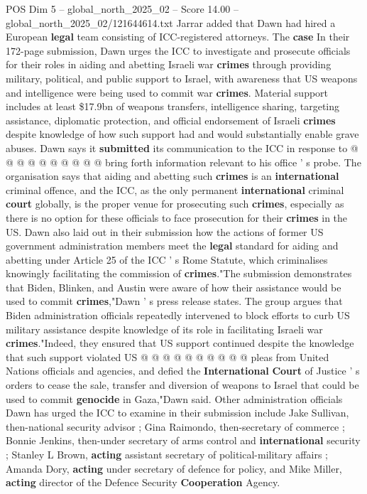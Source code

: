 \begin{textsample}{POS Dim 5 – global\_north\_2025\_02 – Score 14.00 – global\_north\_2025\_02/121644614.txt}
Jarrar added that Dawn had hired a European \textbf{legal} team consisting of ICC-registered attorneys.
The \textbf{case} In their 172-page submission, Dawn urges the ICC to investigate and prosecute officials for their roles in aiding and abetting Israeli war \textbf{crimes} through providing military, political, and public support to Israel, with awareness that US weapons and intelligence were being used to commit war \textbf{crimes}.
Material support includes at least \$17.9bn of weapons transfers, intelligence sharing, targeting assistance, diplomatic protection, and official endorsement of Israeli \textbf{crimes} despite knowledge of how such support had and would substantially enable grave abuses.
Dawn says it \textbf{submitted} its communication to the ICC in response to @ @ @ @ @ @ @ @ @ @ bring forth information relevant to his office ' s probe.
The organisation says that aiding and abetting such \textbf{crimes} is an \textbf{international} criminal offence, and the ICC, as the only permanent \textbf{international} criminal \textbf{court} globally, is the proper venue for prosecuting such \textbf{crimes}, especially as there is no option for these officials to face prosecution for their \textbf{crimes} in the US.
Dawn also laid out in their submission how the actions of former US government administration members meet the \textbf{legal} standard for aiding and abetting under Article 25 of the ICC ' s Rome Statute, which criminalises knowingly facilitating the commission of \textbf{crimes}."The submission demonstrates that Biden, Blinken, and Austin were aware of how their assistance would be used to commit \textbf{crimes},"Dawn ' s press release states.
The group argues that Biden administration officials repeatedly intervened to block efforts to curb US military assistance despite knowledge of its role in facilitating Israeli war \textbf{crimes}."Indeed, they ensured that US support continued despite the knowledge that such support violated US @ @ @ @ @ @ @ @ @ @ pleas from United Nations officials and agencies, and defied the \textbf{International} \textbf{Court} of Justice ' s orders to cease the sale, transfer and diversion of weapons to Israel that could be used to commit \textbf{genocide} in Gaza,"Dawn said.
Other administration officials Dawn has urged the ICC to examine in their submission include Jake Sullivan, then-national security advisor ; Gina Raimondo, then-secretary of commerce ; Bonnie Jenkins, then-under secretary of arms control and \textbf{international} security ; Stanley L Brown, \textbf{acting} assistant secretary of political-military affairs ; Amanda Dory, \textbf{acting} under secretary of defence for policy, and Mike Miller, \textbf{acting} director of the Defence Security \textbf{Cooperation} Agency.

\end{textsample}
